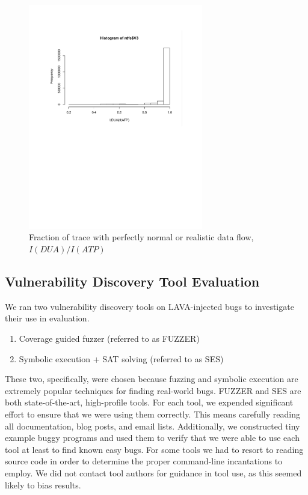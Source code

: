 \begin{figure}
\centering
\includegraphics[width=3in]{rdf.pdf}
\caption{Fraction of trace with perfectly normal or realistic data flow, $I(DUA)/I(ATP)$}
\label{fig:rdf-hist}
\end{figure}




\subsection{Vulnerability Discovery Tool Evaluation}

We ran two vulnerability discovery tools on LAVA-injected bugs to investigate their use in evaluation.

\begin{enumerate}
\item Coverage guided fuzzer (referred to as FUZZER)
\item Symbolic execution + SAT solving (referred to as SES)
\end{enumerate}

These two, specifically, were chosen because fuzzing and symbolic execution are extremely popular techniques for finding real-world bugs.
FUZZER and SES are both state-of-the-art, high-profile tools. 
For each tool, we expended significant effort to ensure that we were using them correctly.
This means carefully reading all documentation, blog posts, and email lists.
Additionally, we constructed tiny example buggy programs and used them to verify that we were able to use each tool at least to find known easy bugs.  
For some tools we had to resort to reading source code in order to determine the proper command-line incantations to employ. 
We did not contact tool authors for guidance in tool use, as this seemed likely to bias results.

